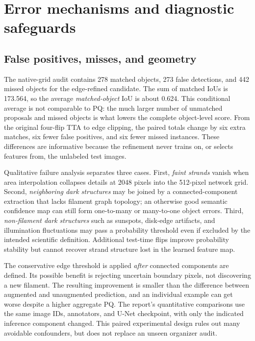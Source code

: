 \documentclass[sigconf,nonacm]{acmart}
\begin{document}
\section{Error mechanisms and diagnostic safeguards}
\subsection{False positives, misses, and geometry}
The native-grid audit contains 278 matched objects, 273 false detections, and 442 missed objects for the edge-refined candidate. The sum of matched IoUs is 173.564, so the average \emph{matched-object} IoU is about 0.624. This conditional average is not comparable to PQ: the much larger number of unmatched proposals and missed objects is what lowers the complete object-level score. From the original four-flip TTA to edge clipping, the paired totals change by six extra matches, six fewer false positives, and six fewer missed instances. These differences are informative because the refinement never trains on, or selects features from, the unlabeled test images.

Qualitative failure analysis separates three cases. First, \emph{faint strands} vanish when area interpolation collapses details at 2048 pixels into the 512-pixel network grid. Second, \emph{neighboring dark structures} may be joined by a connected-component extraction that lacks filament graph topology; an otherwise good semantic confidence map can still form one-to-many or many-to-one object errors. Third, \emph{non-filament dark structures} such as sunspots, disk-edge artifacts, and illumination fluctuations may pass a probability threshold even if excluded by the intended scientific definition. Additional test-time flips improve probability stability but cannot recover strand structure lost in the learned feature map.

The conservative edge threshold is applied \emph{after} connected components are defined. Its possible benefit is rejecting uncertain boundary pixels, not discovering a new filament. The resulting improvement is smaller than the difference between augmented and unaugmented prediction, and an individual example can get worse despite a higher aggregate PQ. The report's quantitative comparisons use the same image IDs, annotators, and U-Net checkpoint, with only the indicated inference component changed. This paired experimental design rules out many avoidable confounders, but does not replace an unseen organizer audit.
\end{document}
